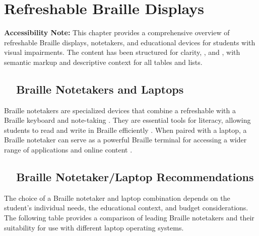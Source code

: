 \chapter{Refreshable Braille Displays}\label{ch3:braille}
\raggedright

\begin{raggedright}
	\textbf{Accessibility Note:} This chapter provides a comprehensive overview of refreshable Braille displays, notetakers, and educational devices for students with visual impairments. The content has been structured for clarity, , and , with semantic markup and descriptive context for all tables and lists.
\end{raggedright}

\section{~~Braille Notetakers and Laptops}\label{ch3:sec:notetakers-laptops}
Braille notetakers are specialized devices that combine a refreshable  with a Braille keyboard and note-taking . They are essential tools for literacy, allowing students to read and write in Braille efficiently \supercite{Holbrook2006, Presley2012, PerkinsNoteTaking, TeachingVI}. When paired with a laptop, a Braille notetaker can serve as a powerful Braille terminal for accessing a wider range of applications and online content \supercite{Kelly2011, Day2021}.

\section{~~Braille Notetaker/Laptop Recommendations}\label{ch3:sec:notetaker-laptop-recs}
The choice of a Braille notetaker and laptop combination depends on the student's individual needs, the educational context, and budget considerations. The following table provides a comparison of leading Braille notetakers and their suitability for use with different laptop operating systems.

